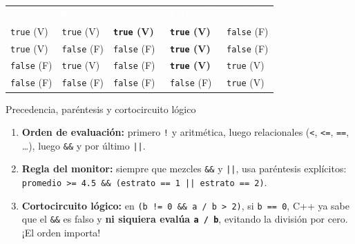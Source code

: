 \documentclass[11pt,letterpaper]{article}
\begin{document}
\begin{center}
  \small
  \renewcommand{\arraystretch}{1.28}
  \begin{tabularx}{0.88\linewidth}{>{\centering\arraybackslash}X >{\centering\arraybackslash}X >{\centering\arraybackslash}X >{\centering\arraybackslash}X >{\centering\arraybackslash}X}
    \rowcolor{AzulMarino}
    \textcolor{white}{\textbf{\texttt{A}}} &
    \textcolor{white}{\textbf{\texttt{B}}} &
    \textcolor{white}{\textbf{\texttt{A \&\& B} (\texttt{Y})}} &
    \textcolor{white}{\textbf{\texttt{A || B} (\texttt{O})}} &
    \textcolor{white}{\textbf{\texttt{!A} (\texttt{NO})}} \\
    \texttt{true} (V) & \texttt{true} (V) & \textbf{\texttt{true} (V)} & \textbf{\texttt{true} (V)} & \texttt{false} (F) \\
    \texttt{true} (V) & \texttt{false} (F) & \texttt{false} (F) & \textbf{\texttt{true} (V)} & \texttt{false} (F) \\
    \texttt{false} (F) & \texttt{true} (V) & \texttt{false} (F) & \textbf{\texttt{true} (V)} & \texttt{true} (V) \\
    \texttt{false} (F) & \texttt{false} (F) & \texttt{false} (F) & \texttt{false} (F) & \texttt{true} (V) \\
    \bottomrule
  \end{tabularx}
\end{center}

\begin{consejo}{Precedencia, paréntesis y cortocircuito lógico}
\begin{enumerate}
  \item \textbf{Orden de evaluación:} primero \texttt{!} y aritmética, luego relacionales (\texttt{<}, \texttt{<=}, \texttt{==}, \dots), luego \texttt{\&\&} y por último \texttt{||}.
  \item \textbf{Regla del monitor:} siempre que mezcles \texttt{\&\&} y \texttt{||}, usa paréntesis explícitos: \texttt{promedio >= 4.5 \&\& (estrato == 1 || estrato == 2)}.
  \item \textbf{Cortocircuito lógico:} en \texttt{(b != 0 \&\& a / b > 2)}, si \texttt{b == 0}, C++ ya sabe que el \texttt{\&\&} es falso y \textbf{ni siquiera evalúa \texttt{a / b}}, evitando la división por cero. ¡El orden importa!
\end{enumerate}
\end{consejo}

\end{document}
